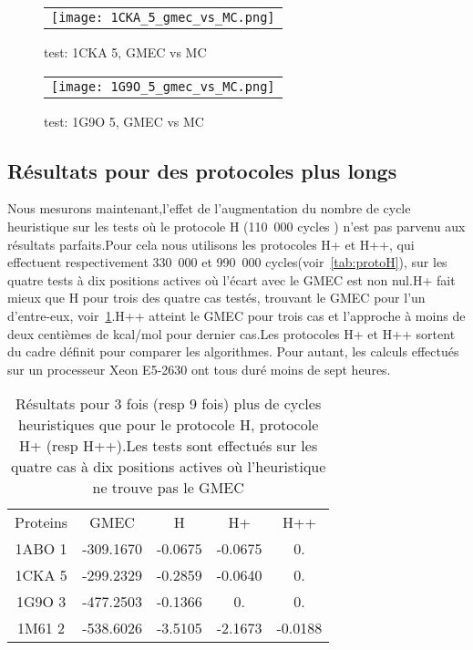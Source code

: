     \begin{figure}[h]
      \centering
      \begin{tabular}{c} 
        \texttt{[image: 1CKA\_5\_gmec\_vs\_MC.png]} 
      \end{tabular}
      
      \caption{test: 1CKA 5, GMEC vs MC}
\label{image:1CKA_5_GMEC_vs_MC}
    \end{figure}
    
    \begin{figure}[h]
      \centering
      \begin{tabular}{c} 
        \texttt{[image: 1G9O\_5\_gmec\_vs\_MC.png]} 
      \end{tabular}
      
      \caption{test: 1G9O 5, GMEC vs MC}
\label{image:1G9O_5_GMEC_vs_MC}
    \end{figure}
    
    \clearpage

   \subsection{Résultats pour des protocoles plus longs}

Nous mesurons maintenant,l'effet de l'augmentation du nombre de cycle heuristique sur les tests où le protocole H (110~000 cycles ) n'est pas parvenu aux résultats parfaits.Pour cela nous utilisons les protocoles H+ et H++, qui effectuent respectivement 330~000 et 990~000 cycles(voir~\ref{tab:protoH}), sur les quatre tests à dix positions actives où l'écart avec le GMEC est non nul.H+ fait mieux que H pour trois des quatre cas testés, trouvant le GMEC pour l'un d'entre-eux, voir~\ref{tab:H+_H++}.H++ atteint le GMEC pour trois cas et l'approche à moins de deux centièmes de kcal/mol pour dernier cas.Les protocoles H+ et H++ sortent du cadre définit pour comparer les algorithmes. Pour autant, les calculs effectués sur un processeur Xeon E5-2630  ont tous duré moins de sept heures.  

    \begin{table}[h]
      \centering

      \begin{tabular}{ccccc}

        \toprule
        Proteins & GMEC & H & H+ & H++ \\
        \cmidrule{1-5}
        1ABO 1 & -309.1670 & -0.0675 & -0.0675 & 0. \\
        1CKA 5 & -299.2329 & -0.2859 & -0.0640 & 0. \\
        1G9O 3 & -477.2503 & -0.1366 & 0. & 0. \\
        1M61 2 & -538.6026 & -3.5105 & -2.1673 & -0.0188 \\
        \toprule


 \end{tabular}      
 \caption{Résultats pour 3 fois (resp 9 fois) plus de cycles heuristiques que pour le protocole H, protocole H+ (resp H++).Les tests sont effectués sur les quatre cas à dix positions actives où l'heuristique ne trouve pas le GMEC}
\label{tab:H+_H++}       
\end{table}


